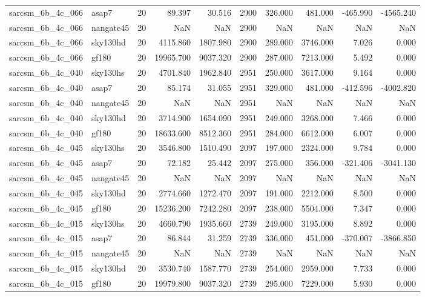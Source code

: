 \begin{longtable}{llrrrrrrrr}
sarcsm\_6b\_4c\_066 & asap7 & 20 & 89.397 & 30.516 & 2900 & 326.000 & 481.000 & -465.990 & -4565.240 \\
sarcsm\_6b\_4c\_066 & nangate45 & 20 & NaN & NaN & 2900 & NaN & NaN & NaN & NaN \\
sarcsm\_6b\_4c\_066 & sky130hd & 20 & 4115.860 & 1807.980 & 2900 & 289.000 & 3746.000 & 7.026 & 0.000 \\
sarcsm\_6b\_4c\_066 & gf180 & 20 & 19965.700 & 9037.320 & 2900 & 287.000 & 7213.000 & 5.492 & 0.000 \\
sarcsm\_6b\_4c\_040 & sky130hs & 20 & 4701.840 & 1962.840 & 2951 & 250.000 & 3617.000 & 9.164 & 0.000 \\
sarcsm\_6b\_4c\_040 & asap7 & 20 & 85.174 & 31.055 & 2951 & 329.000 & 481.000 & -412.596 & -4002.820 \\
sarcsm\_6b\_4c\_040 & nangate45 & 20 & NaN & NaN & 2951 & NaN & NaN & NaN & NaN \\
sarcsm\_6b\_4c\_040 & sky130hd & 20 & 3714.900 & 1654.090 & 2951 & 249.000 & 3268.000 & 7.466 & 0.000 \\
sarcsm\_6b\_4c\_040 & gf180 & 20 & 18633.600 & 8512.360 & 2951 & 284.000 & 6612.000 & 6.007 & 0.000 \\
sarcsm\_6b\_4c\_045 & sky130hs & 20 & 3546.800 & 1510.490 & 2097 & 197.000 & 2324.000 & 9.784 & 0.000 \\
sarcsm\_6b\_4c\_045 & asap7 & 20 & 72.182 & 25.442 & 2097 & 275.000 & 356.000 & -321.406 & -3041.130 \\
sarcsm\_6b\_4c\_045 & nangate45 & 20 & NaN & NaN & 2097 & NaN & NaN & NaN & NaN \\
sarcsm\_6b\_4c\_045 & sky130hd & 20 & 2774.660 & 1272.470 & 2097 & 191.000 & 2212.000 & 8.500 & 0.000 \\
sarcsm\_6b\_4c\_045 & gf180 & 20 & 15236.200 & 7242.280 & 2097 & 238.000 & 5504.000 & 7.347 & 0.000 \\
sarcsm\_6b\_4c\_015 & sky130hs & 20 & 4660.790 & 1935.660 & 2739 & 249.000 & 3195.000 & 8.892 & 0.000 \\
sarcsm\_6b\_4c\_015 & asap7 & 20 & 86.844 & 31.259 & 2739 & 336.000 & 451.000 & -370.007 & -3866.850 \\
sarcsm\_6b\_4c\_015 & nangate45 & 20 & NaN & NaN & 2739 & NaN & NaN & NaN & NaN \\
sarcsm\_6b\_4c\_015 & sky130hd & 20 & 3530.740 & 1587.770 & 2739 & 254.000 & 2959.000 & 7.733 & 0.000 \\
sarcsm\_6b\_4c\_015 & gf180 & 20 & 19979.800 & 9037.320 & 2739 & 295.000 & 7229.000 & 5.930 & 0.000 \\

\end{longtable}
